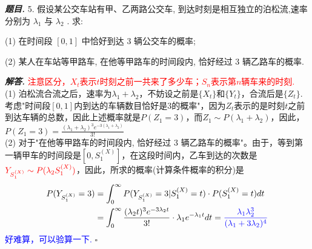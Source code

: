 \documentclass[10pt, a4paper, oneside]{ctexart}
\newenvironment{problem}{\begin{framed}\par\noindent\textbf{\textit{题目. }}}{\end{framed}\par}
\newenvironment{solution}{%
  \par\noindent\textbf{\textit{解答. }}\ignorespaces
}{%
  \hfill\ensuremath{\square}\par %
}
\begin{document}
\begin{problem}
    5. 假设某公交车站有甲、乙两路公交车, 到达时刻是相互独立的泊松流,速率分别为 \( {\lambda }_{1} \) 与 \( {\lambda }_{2} \) . 求:

(1) 在时间段 \( \left\lbrack  {0,1}\right\rbrack   \) 中恰好到达 3 辆公交车的概率;

(2) 某人在车站等甲路车, 在他等甲路车的时间段内, 恰好经过 3 辆乙路车的概率.
\end{problem}
\begin{solution}\textcolor{red}{注意区分，$X_t$表示$t$时刻之前一共来了多少车；$S_n$表示第$n$辆车来的时刻.}
    \\(1) 泊松流合流之后，速率为$\lambda_1+\lambda_2$，不妨设之前是$\{X_t\}$和$\{Y_t\}$，合流后是$\{Z_t\}$. 考虑"时间段$[0,1]$内到达的车辆数目恰好是$3$的概率"，因为$Z_t$表示的是时刻$t$之前到达车辆的总数，因此上述概率就是$P(Z_1=3)$，而$Z_1\sim P(\lambda_1+\lambda_2)$，因此，$P(Z_1=3)=\frac{(\lambda_1+\lambda_2)^3e^{-3(\lambda_1+\lambda_2)}}{3!}$\\
    (2) 对于"在他等甲路车的时间段内, 恰好经过 3 辆乙路车的概率"。由于，等到第一辆甲车的时间段是$[0,S_1^{(X)}]$，在这段时间内，乙车到达的次数是$\textcolor{red}{Y_{S_1^{(X)}}\sim P(\lambda_2S_1^{(X)})}$，因此，所求的概率(计算条件概率的积分)是
    \begin{align*}
        P(Y_{S_1^{(X)}}=3)&=\int_0^{\infty} P(Y_{S_1^{(X)}}=3|S_1^{(X)}=t)\cdot P(S_1^{(X)}=t) dt\\
        &=\int_0^{\infty}\frac{(\lambda_2t)^3e^{-3\lambda_2 t}}{3!}\cdot \lambda_1 e^{-\lambda_1 t}dt=\textcolor{blue}{\frac{\lambda_1\lambda_2^3}{(\lambda_1+3\lambda_2)^4}}
    \end{align*}
    \textcolor{blue}{好难算，可以验算一下.}
\end{solution}
\end{document}
